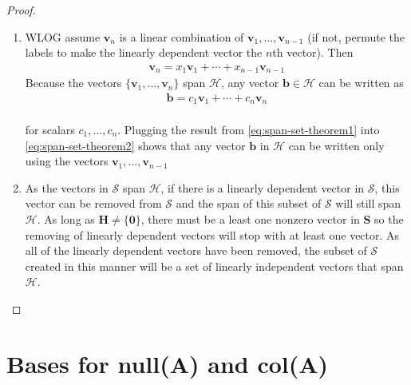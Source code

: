 \documentclass[
]{book}
\theoremstyle{definition}
\theoremstyle{definition}
\theoremstyle{definition}
\theoremstyle{definition}
\theoremstyle{remark}
\begin{document}
\begin{proof}

\begin{enumerate}
\def\labelenumi{\alph{enumi})}
\item
  WLOG assume \(\mathbf{v}_n\) is a linear combination of \(\mathbf{v}_1, \ldots, \mathbf{v}_{n-1}\) (if not, permute the labels to make the linearly dependent vector the \(n\)th vector). Then
  \[
  \begin{aligned}
  \mathbf{v}_n = x_1 \mathbf{v}_1 + \cdots + x_{n-1} \mathbf{v}_{n-1}
  \end{aligned}
  \label{eq:span-set-theorem1}
  \]
  Because the vectors \(\{\mathbf{v}_1, \ldots, \mathbf{v}_n\}\) span \(\mathcal{H}\), any vector \(\mathbf{b}\in \mathcal{H}\) can be written as
  \[
  \begin{aligned}
  \mathbf{b} = c_1 \mathbf{v}_1 + \cdots + c_{n} \mathbf{v}_{n}
  \end{aligned}
  \label{eq:span-set-theorem2}
  \]\\
  for scalars \(c_1, \ldots, c_n\). Plugging the result from \eqref{eq:span-set-theorem1} into \eqref{eq:span-set-theorem2} shows that any vector \(\mathbf{b}\) in \(\mathcal{H}\) can be written only using the vectors \(\mathbf{v}_1, \ldots, \mathbf{v}_{n-1}\)
\item
  As the vectors in \(\mathcal{S}\) span \(\mathcal{H}\), if there is a linearly dependent vector in \(\mathcal{S}\), this vector can be removed from \(\mathcal{S}\) and the span of this subset of \(\mathcal{S}\) will still span \(\mathcal{H}\). As long as \(\mathbf{H} \neq \{\mathbf{0}\}\), there must be a least one nonzero vector in \(\mathbf{S}\) so the removing of linearly dependent vectors will stop with at least one vector. As all of the linearly dependent vectors have been removed, the subset of \(\mathcal{S}\) created in this manner will be a set of linearly independent vectors that span \(\mathcal{H}\).
\end{enumerate}

\end{proof}

\hypertarget{bases-for-nullmathbfa-and-colmathbfa}{%
\section{\texorpdfstring{Bases for null(\(\mathbf{A}\)) and col(\(\mathbf{A}\))}{Bases for null(\textbackslash mathbf\{A\}) and col(\textbackslash mathbf\{A\})}}\label{bases-for-nullmathbfa-and-colmathbfa}}
\end{document}
